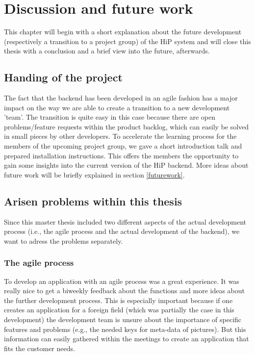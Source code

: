 \chapter[Discussion and future work]{Discussion and future work}
This chapter will begin with a short explanation about the future development (respectively a transition to a project group) of the \ac{HiP} system and will close this thesis with a conclusion and a brief view into the future, afterwards. 

\section{Handing of the project}
The fact that the backend has been developed in an agile fashion has a major impact on the way we are able to create a transition to a new development 'team'.  The transition is quite easy in this case because there are open problems/feature requests within the product backlog, which can easily be solved in small pieces by other developers. To accelerate the learning process for the members of the upcoming project group, we gave a short introduction talk and prepared installation instructions. This offers the members the opportunity to gain some insights into the current version of the \ac{HiP} backend. More ideas about future work will be briefly explained in section \ref{futurework}. 

\section{Arisen problems within this thesis}
Since this master thesis included two different aspects of the actual development process (i.e., the agile process and the actual development of the backend), we want to adress the problems separately. 

\subsection{The agile process}
To develop an application with an agile process was a great experience. It was really nice to get a biweekly feedback about the functions and more ideas about the further development process. This is especially important because if one creates an application for a foreign field (which was partially the case in this development) the development team is unsure about the importance of specific features and problems (e.g., the needed keys for meta-data of pictures). But this information can easily gathered within the meetings to create an application that fits the customer needs. 


